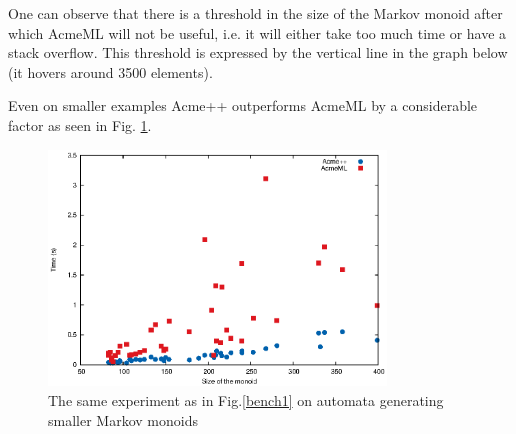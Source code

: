 One can observe that there is a threshold in the size of the Markov
monoid after which AcmeML will not be useful, i.e. it will either take
too much time or have a stack overflow. This threshold is expressed by
the vertical line in the graph below (it hovers around 3500 elements).

Even on smaller examples Acme++ outperforms AcmeML by a considerable
factor as seen in Fig. \ref{bench1zoomed}.

\begin{figure}[h!]
  \label{bench1zoomed}
  \begin{center}
    \includegraphics[width=0.8\textwidth]{graph/zoomlines}
    \caption{The same experiment as in Fig.\ref{bench1} on automata
      generating smaller Markov monoids}
  \end{center}  
\end{figure}
